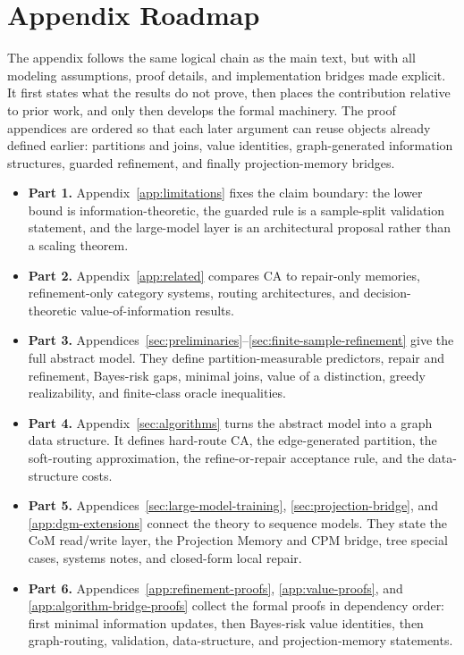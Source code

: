 \section{Appendix Roadmap}
\label{app:roadmap}

The appendix follows the same logical chain as the main text, but with all modeling assumptions, proof details, and implementation bridges made explicit. It first states what the results do not prove, then places the contribution relative to prior work, and only then develops the formal machinery. The proof appendices are ordered so that each later argument can reuse objects already defined earlier: partitions and joins, value identities, graph-generated information structures, guarded refinement, and finally projection-memory bridges.

\begin{itemize}
\item {\bf Part 1.} Appendix~\ref{app:limitations} fixes the claim boundary: the lower bound is information-theoretic, the guarded rule is a sample-split validation statement, and the large-model layer is an architectural proposal rather than a scaling theorem.
\item {\bf Part 2.} Appendix~\ref{app:related} compares CA to repair-only memories, refinement-only category systems, routing architectures, and decision-theoretic value-of-information results.
\item {\bf Part 3.} Appendices~\ref{sec:preliminaries}--\ref{sec:finite-sample-refinement} give the full abstract model. They define partition-measurable predictors, repair and refinement, Bayes-risk gaps, minimal joins, value of a distinction, greedy realizability, and finite-class oracle inequalities.
\item {\bf Part 4.} Appendix~\ref{sec:algorithms} turns the abstract model into a graph data structure. It defines hard-route CA, the edge-generated partition, the soft-routing approximation, the refine-or-repair acceptance rule, and the data-structure costs.
\item {\bf Part 5.} Appendices~\ref{sec:large-model-training}, \ref{sec:projection-bridge}, and \ref{app:dgm-extensions} connect the theory to sequence models. They state the CoM read/write layer, the Projection Memory and CPM bridge, tree special cases, systems notes, and closed-form local repair.
\item {\bf Part 6.} Appendices~\ref{app:refinement-proofs}, \ref{app:value-proofs}, and \ref{app:algorithm-bridge-proofs} collect the formal proofs in dependency order: first minimal information updates, then Bayes-risk value identities, then graph-routing, validation, data-structure, and projection-memory statements.
\end{itemize}

